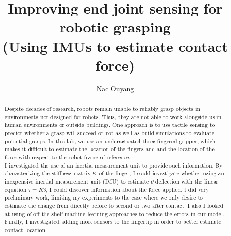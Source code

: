 \documentclass[preprint,12pt,3p]{elsarticle}
\begin{document}
\begin{frontmatter}

\title{ Improving end joint sensing for robotic grasping\\
(Using IMUs to estimate contact force) }


\author{Nao Ouyang}






\begin{abstract}
    Despite decades of research, robots remain unable to reliably grasp objects in environments not
    designed for robots. Thus, they are not able to work alongside us in human environments or
    outside buildings. One approach is to use tactile sensing to predict whether a
    grasp will succeed or not as well as build simulations to evaluate potential grasps.
    In this lab, we use an underactuated three-fingered gripper, which makes it difficult to
    estimate the location of the fingers and and the location of the force with respect to the robot
    frame of reference.  \\
    I investigated the use of an inertial measurement unit to provide such information. By
    characterizing the stiffness matrix $K$ of the finger, I could investigate whether using an
    inexpensive inertial measurement unit (IMU) to estimate $\theta$ deflection with the linear equation
    $\tau = K \theta$, I could discover information about the force applied. I did very preliminary
    work, limiting my experiments to the case where we only desire to estimate the change from
    directly before to second or two after
    contact. I also I looked at using of off-the-shelf machine learning approaches to reduce the
    errors in our model. Finally, I investigated adding more sensors to the fingertip in
    order to better estimate contact location. 
\end{abstract}



\end{frontmatter}
\end{document}
